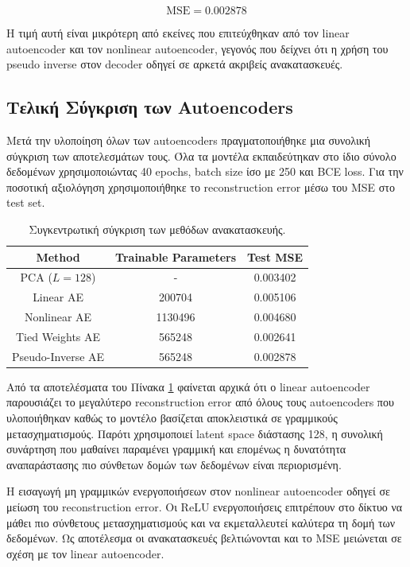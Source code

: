 \documentclass[12pt]{article}
\begin{document}
\begin{equation}
\mathrm{MSE}=0.002878
\end{equation}

Η τιμή αυτή είναι μικρότερη από εκείνες που επιτεύχθηκαν από τον linear autoencoder και τον nonlinear autoencoder, γεγονός που δείχνει ότι η 
χρήση του pseudo inverse στον decoder οδηγεί σε αρκετά ακριβείς ανακατασκευές.


\subsection{Τελική Σύγκριση των Autoencoders}

Μετά την υλοποίηση όλων των autoencoders πραγματοποιήθηκε μια συνολική σύγκριση των αποτελεσμάτων τους. Όλα τα μοντέλα εκπαιδεύτηκαν στο 
ίδιο σύνολο δεδομένων χρησιμοποιώντας 40 epochs, batch size ίσο με 250 και BCE loss. Για την ποσοτική αξιολόγηση χρησιμοποιήθηκε το 
reconstruction error μέσω του MSE στο test set.

\begin{table}[H]
\centering
\begin{tabular}{|c|c|c|}
\hline
Method & Trainable Parameters & Test MSE \\
\hline
PCA ($L=128$) & - & 0.003402 \\
Linear AE & 200704 & 0.005106 \\
Nonlinear AE & 1130496 & 0.004680 \\
Tied Weights AE & 565248 & 0.002641 \\
Pseudo-Inverse AE & 565248 & 0.002878 \\
\hline
\end{tabular}
\caption{Συγκεντρωτική σύγκριση των μεθόδων ανακατασκευής.}
\label{tab:final_ae_comparison}
\end{table}

Από τα αποτελέσματα του Πίνακα \ref{tab:final_ae_comparison} φαίνεται αρχικά ότι ο linear autoencoder παρουσιάζει το μεγαλύτερο reconstruction 
error από όλους τους autoencoders που υλοποιήθηκαν καθώς το μοντέλο βασίζεται αποκλειστικά σε γραμμικούς μετασχηματισμούς. Παρότι χρησιμοποιεί 
latent space διάστασης 128, η συνολική συνάρτηση που μαθαίνει παραμένει γραμμική και επομένως η δυνατότητα αναπαράστασης πιο σύνθετων δομών 
των δεδομένων είναι περιορισμένη. 

Η εισαγωγή μη γραμμικών ενεργοποιήσεων στον nonlinear autoencoder οδηγεί σε μείωση του reconstruction error. Οι ReLU ενεργοποιήσεις επιτρέπουν 
στο δίκτυο να μάθει πιο σύνθετους μετασχηματισμούς και να εκμεταλλευτεί καλύτερα τη δομή των δεδομένων. Ως αποτέλεσμα οι ανακατασκευές 
βελτιώνονται και το MSE μειώνεται σε σχέση με τον linear autoencoder. 
\end{document}
